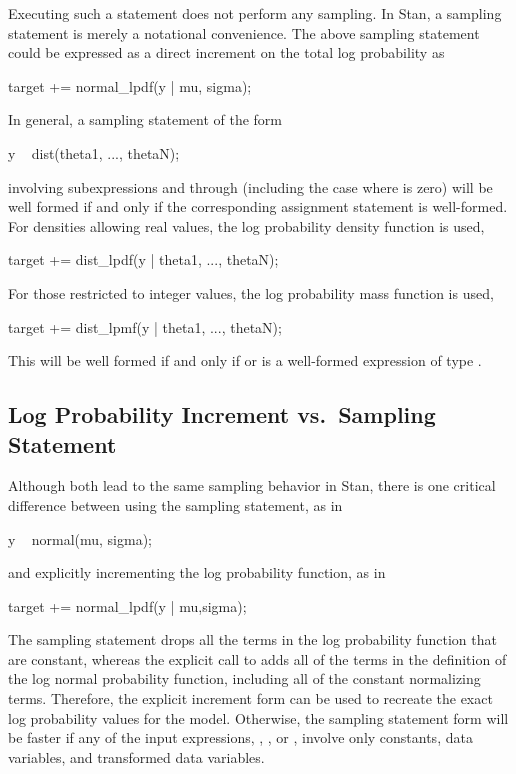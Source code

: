 Executing such a statement does not perform any sampling.  In Stan, a
sampling statement is merely a notational convenience.  The above
sampling statement could be expressed as a direct increment on the
total log probability as
%
\begin{stancode}
target += normal_lpdf(y | mu, sigma);
\end{stancode}

In general, a sampling statement of the form
%
\begin{stancode}
y ~ dist(theta1, ..., thetaN);
\end{stancode}
%
involving subexpressions  and  through
 (including the case where  is zero) will be well
formed if and only if the corresponding assignment statement is
well-formed.  For densities allowing real  values, the log
probability density function is used,
%
\begin{stancode}
target += dist_lpdf(y | theta1, ..., thetaN);
\end{stancode}
%
For those restricted to integer  values, the log probability
mass function is used,
%
\begin{stancode}
target += dist_lpmf(y | theta1, ..., thetaN);
\end{stancode}
%

This will be well formed if and only if  or  is a
well-formed expression of type .

\subsection{Log Probability Increment vs.\ Sampling Statement}

Although both lead to the same sampling behavior in Stan, there is one
critical difference between using the sampling statement, as in
%
\begin{stancode}
y ~ normal(mu, sigma);
\end{stancode}
%
and explicitly incrementing the log probability function, as in
%
\begin{stancode}
target += normal_lpdf(y | mu,sigma);
\end{stancode}
%
The sampling statement drops all the terms in the log probability
function that are constant, whereas the explicit call to
 adds all of the terms in the definition of the log
normal probability function, including all of the constant normalizing
terms.  Therefore, the explicit increment form can be used to recreate
the exact log probability values for the model.  Otherwise, the
sampling statement form will be faster if any of the input expressions,
, , or , involve only constants, data
variables, and transformed data variables.


